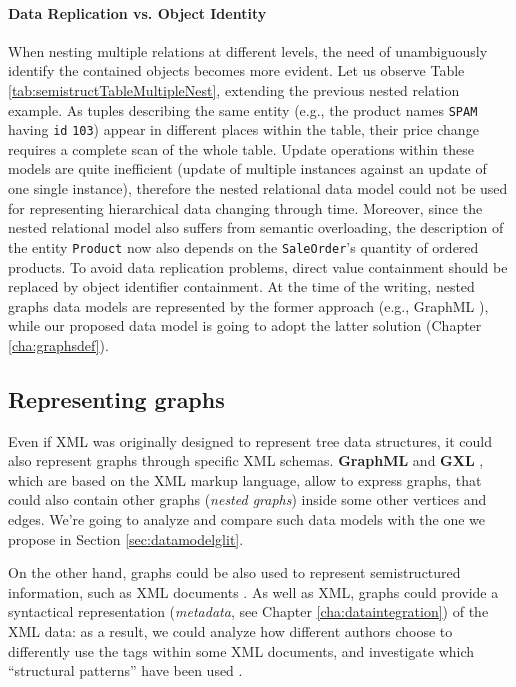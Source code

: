 \paragraph*{Data Replication vs. Object Identity}
When nesting multiple relations at different levels, the need of unambiguously identify the contained objects becomes more evident. Let us observe Table \ref{tab:semistructTableMultipleNest}, extending the previous nested relation example. As  tuples describing the same entity (e.g., the product names \texttt{SPAM} having \texttt{id} \texttt{103}) appear in different places within the table, their price change requires a complete scan of the whole table. Update operations within these models are quite inefficient (update of multiple instances against an update of one single instance), therefore the nested relational data model could not be used for representing hierarchical data changing through time. Moreover, since the nested relational model also suffers from semantic overloading, the description of the entity \texttt{Product} now also depends on the \texttt{SaleOrder}'s quantity of ordered products.
To avoid data replication problems, direct value containment should be replaced by object identifier containment. At the time of the writing, nested graphs data models are represented by the former approach (e.g., GraphML \cite{graphml}), while our proposed data model is going to adopt the latter solution (Chapter \ref{cha:graphsdef}).


\subsection{Representing graphs}
Even if XML was originally designed to represent tree data structures, it could also  represent graphs through specific XML schemas. \textbf{GraphML} \cite{graphml} and \textbf{GXL} \cite{gxlgraphml}, which are based on the XML markup language, allow to express graphs, that could also contain other graphs (\textit{nested graphs}) inside some other vertices and edges. We're going to analyze and compare such data models with the one we propose in Section \vref{sec:datamodelglit}.


On the other hand, graphs could be also used to represent semistructured information, such as XML documents \cite{Lassila1999,GutierrezInclusion}. As well as XML, graphs could provide a syntactical representation (\textit{metadata}, see Chapter \ref{cha:dataintegration}) of the XML data: as a result, we could analyze how different authors choose to differently use the tags within some XML documents, and investigate which ``structural patterns'' have been used \cite{IorioHierarchy,BarabucciEARMARK}. 

